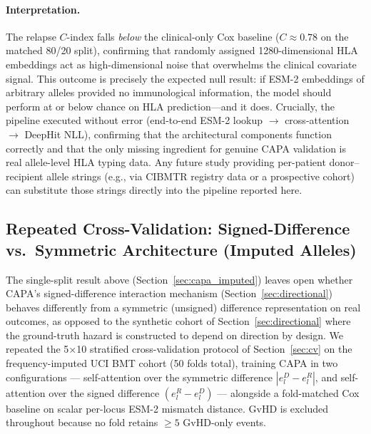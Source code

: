 \documentclass[11pt,a4paper]{article}
\begin{document}
\paragraph{Interpretation.}
The relapse $C$-index falls \emph{below} the clinical-only Cox baseline
($C \approx 0.78$ on the matched 80/20 split), confirming that randomly
assigned 1280-dimensional HLA embeddings act as high-dimensional noise that
overwhelms the clinical covariate signal.  This outcome is precisely the
expected null result: if ESM-2 embeddings of arbitrary alleles provided no
immunological information, the model should perform at or below chance on HLA
prediction---and it does.  Crucially, the pipeline executed without error
(end-to-end ESM-2 lookup $\to$ cross-attention $\to$ DeepHit NLL), confirming
that the architectural components function correctly and that the only missing
ingredient for genuine CAPA validation is real allele-level HLA typing data.
Any future study providing per-patient donor--recipient allele strings (e.g.,
via CIBMTR registry data or a prospective cohort) can substitute those strings
directly into the pipeline reported here.

\subsection{Repeated Cross-Validation: Signed-Difference vs.\ Symmetric Architecture (Imputed Alleles)}
\label{sec:cv_diffmode}

The single-split result above (Section~\ref{sec:capa_imputed}) leaves open
whether CAPA's signed-difference interaction mechanism (Section~\ref{sec:directional})
behaves differently from a symmetric (unsigned) difference representation on
real outcomes, as opposed to the synthetic cohort of
Section~\ref{sec:directional} where the ground-truth hazard is constructed to
depend on direction by design.  We repeated the 5$\times$10 stratified
cross-validation protocol of Section~\ref{sec:cv} on the frequency-imputed
UCI BMT cohort (50 folds total), training CAPA in two configurations ---
self-attention over the symmetric difference $|e^D_l - e^R_l|$, and
self-attention over the signed difference $(e^R_l - e^D_l)$ --- alongside a
fold-matched Cox baseline on scalar per-locus ESM-2 mismatch distance.
GvHD is excluded throughout because no fold retains $\geq 5$ GvHD-only events.
\end{document}
